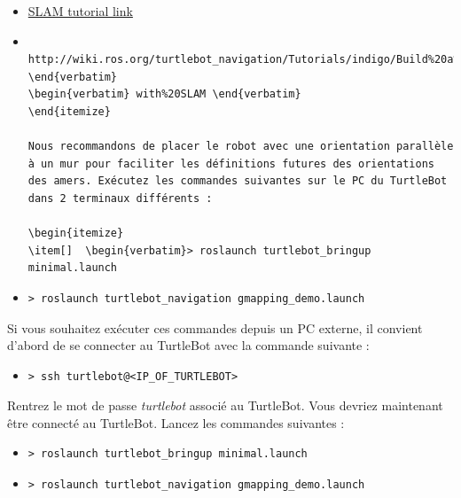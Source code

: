 \documentclass[10pt,a4paper]{article}
\begin{document}
\begin{itemize}
\item[•] \href{http://wiki.ros.org/turtlebot_navigation/Tutorials/indigo/Build%20a%20map%20with%20SLAM}{SLAM tutorial link} 
\item[ ] \begin{verbatim} http://wiki.ros.org/turtlebot_navigation/Tutorials/indigo/Build%20a%20map%20 \end{verbatim} 
\begin{verbatim} with%20SLAM \end{verbatim}
\end{itemize}

Nous recommandons de placer le robot avec une orientation parallèle à un mur pour faciliter les définitions futures des orientations des amers. Exécutez les commandes suivantes sur le PC du TurtleBot dans 2 terminaux différents :

\begin{itemize}
\item[]  \begin{verbatim}> roslaunch turtlebot_bringup minimal.launch \end{verbatim}
\item[]  \begin{verbatim}> roslaunch turtlebot_navigation gmapping_demo.launch \end{verbatim}
\end{itemize}

\newpage
Si vous souhaitez exécuter ces commandes depuis un PC externe, il convient d'abord de se connecter au TurtleBot avec la commande suivante :
\begin{itemize}
\item[] \begin{verbatim}> ssh turtlebot@<IP_OF_TURTLEBOT> \end{verbatim}
\end{itemize}
Rentrez le mot de passe \upshape \emph{turtlebot} associé au TurtleBot. Vous devriez maintenant être connecté au TurtleBot. Lancez les commandes suivantes :
\begin{itemize}
\item[]  \begin{verbatim}> roslaunch turtlebot_bringup minimal.launch \end{verbatim}
\item[]  \begin{verbatim}> roslaunch turtlebot_navigation gmapping_demo.launch \end{verbatim}
\end{itemize}
\end{document}
